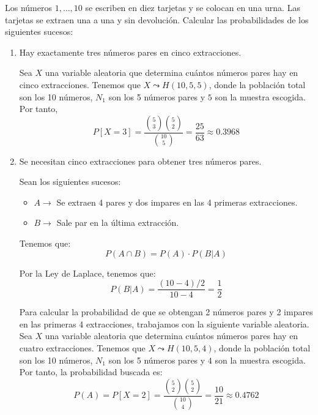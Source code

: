 \begin{ejercicio}
     Los números $1,\dots,10$ se escriben en diez tarjetas y se colocan en una urna. Las tarjetas se extraen una a una y sin devolución. Calcular las probabilidades de los siguientes sucesos:
     \begin{enumerate}
         \item Hay exactamente tres números pares en cinco extracciones.

         Sea $X$ una variable aleatoria que determina cuántos números pares hay en cinco extracciones. Tenemos que $X\leadsto H(10, 5, 5)$, donde la población total son los 10 números, $N_1$ son los 5 números pares y $5$ son la muestra escogida. Por tanto,
         \begin{equation*}
             P[X=3]=\frac{\binom{5}{3}\binom{5}{2}}{\binom{10}{5}} = \frac{25}{63}\approx 0.3968
         \end{equation*}
         
         \item Se necesitan cinco extracciones para obtener tres números pares.

         Sean los siguientes sucesos:
         \begin{itemize}
             \item $A\longrightarrow $ Se extraen 4 pares y dos impares en las 4 primeras extracciones.

             \item $B\longrightarrow $ Sale par en la última extracción.
         \end{itemize}
         
         Tenemos que:
         \begin{equation*}
             P(A\cap B)=P(A)\cdot P(B|A)
         \end{equation*}

         Por la Ley de Laplace, tenemos que:
         \begin{equation*}
             P(B|A)=\frac{(10-4)/2}{10-4} = \frac{1}{2}
         \end{equation*}

         Para calcular la probabilidad de que se obtengan 2 números pares y 2 impares en las primeras 4 extracciones, trabajamos con la siguiente variable aleatoria. Sea $X$ una variable aleatoria que determina cuántos números pares hay en cuatro extracciones. Tenemos que $X\leadsto H(10, 5, 4)$, donde la población total son los 10 números, $N_1$ son los 5 números pares y $4$ son la muestra escogida. Por tanto, la probabilidad buscada es:
         \begin{equation*}
             P(A)=P[X=2]= \frac{\binom{5}{2}\binom{5}{2}}{\binom{10}{4}} = \frac{10}{21}\approx 0.4762
         \end{equation*}


\end{enumerate}
\end{ejercicio}
